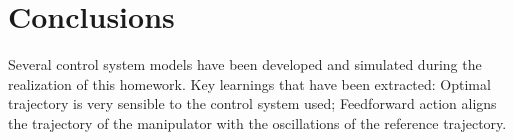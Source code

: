 \section{Conclusions}

Several control system models have been developed and simulated during the
realization of this homework. Key learnings that have been extracted: Optimal
trajectory is very sensible to the control system used; Feedforward action
aligns the trajectory of the manipulator with the oscillations of the reference
trajectory.
